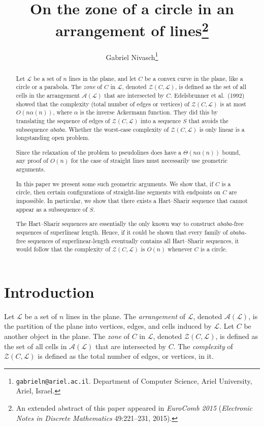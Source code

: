 \documentclass[11pt]{article}
\date{}
\author{Gabriel Nivasch\footnote{\texttt{gabrieln@ariel.ac.il}. Department of Computer Science, Ariel University, Ariel, Israel.}}
\title{On the zone of a circle in an arrangement of lines\footnote{An extended abstract of this paper appeared in \emph{EuroComb 2015} (\emph{Electronic Notes in Discrete Mathematics} 49:221--231, 2015).}}
\theoremstyle{definition}
\theoremstyle{remark}
\begin{document}
\maketitle

\begin{abstract}
Let $\mathcal L$ be a set of $n$ lines in the plane, and let $C$ be a convex curve in the plane, like a circle or a parabola. The \emph{zone} of $C$ in $\mathcal L$, denoted $\mathcal Z(C,\mathcal L)$, is defined as the set of all cells in the arrangement $\mathcal A(\mathcal L)$ that are intersected by $C$. Edelsbrunner et al.~(1992) showed that the complexity (total number of edges or vertices) of $\mathcal Z(C,\mathcal L)$ is at most $O(n\alpha(n))$, where $\alpha$ is the inverse Ackermann function. They did this by translating the sequence of edges of $\mathcal Z(C,\mathcal L)$ into a sequence $S$ that avoids the subsequence $ababa$. Whether the worst-case complexity of $\mathcal Z(C,\mathcal L)$ is only linear is a longstanding open problem.

Since the relaxation of the problem to pseudolines does have a $\Theta(n\alpha(n))$ bound, any proof of $O(n)$ for the case of straight lines must necessarily use geometric arguments.

In this paper we present some such geometric arguments. We show that, if $C$ is a circle, then certain configurations of straight-line segments with endpoints on $C$ are impossible. In particular, we show that there exists a Hart--Sharir sequence that cannot appear as a subsequence of $S$.

The Hart--Sharir sequences are essentially the only known way to construct $ababa$-free sequences of superlinear length. Hence, if it could be shown that every family of $ababa$-free sequences of superlinear-length eventually contains all Hart--Sharir sequences, it would follow that the complexity of $\mathcal Z(C,\mathcal L)$ is $O(n)$ whenever $C$ is a circle.
\end{abstract}

\section{Introduction}

Let $\mathcal L$ be a set of $n$ lines in the plane. The \emph{arrangement} of $\mathcal L$, denoted $\mathcal A(\mathcal L)$, is the partition of the plane into vertices, edges, and cells induced by $\mathcal L$. Let $C$ be another object in the plane. The \emph{zone} of $C$ in $\mathcal L$, denoted $\mathcal Z(C,\mathcal L)$, is defined as the set of all cells in $\mathcal A(\mathcal L)$ that are intersected by $C$. The \emph{complexity} of $\mathcal Z(C,\mathcal L)$ is defined as the total number of edges, or vertices, in it.
\end{document}
